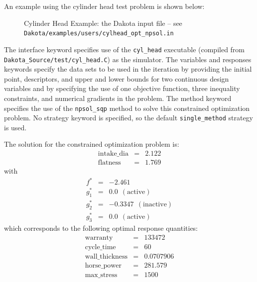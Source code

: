An example using the cylinder head test problem is shown below:
\begin{figure}[ht!]
  \centering
  \begin{small}
    \begin{bigbox}
    \end{bigbox}
  \end{small}
  \caption{Cylinder Head Example: the Dakota input file --
see \texttt{Dakota/examples/users/cylhead\_opt\_npsol.in} }
  \label{additional:cylinder_head}
\end{figure}

The interface keyword specifies use of the \texttt{cyl\_head}
executable (compiled from \texttt{Dakota\_Source/test/cyl\_head.C}) as the
simulator. The variables and responses keywords specify the data sets
to be used in the iteration by providing the initial point,
descriptors, and upper and lower bounds for two continuous design
variables and by specifying the use of one objective function, three
inequality constraints, and numerical gradients in the problem. The
method keyword specifies the use of the \texttt{npsol\_sqp} method to
solve this constrained optimization problem. No strategy keyword is
specified, so the default \texttt{single\_method} strategy is used.

The solution for the constrained optimization problem is:
\begin{eqnarray*}
    \mathrm{intake\_dia} &=& 2.122 \\
    \mathrm{flatness}    &=& 1.769
\end{eqnarray*}
with
\begin{eqnarray*}
      f^{\ast} &=& -2.461 \\
    g_1^{\ast} &=&  0.0    ~~\mathrm{(active)} \\
    g_2^{\ast} &=& -0.3347 ~~\mathrm{(inactive)} \\
    g_3^{\ast} &=&  0.0    ~~\mathrm{(active)}
\end{eqnarray*}
which corresponds to the following optimal response quantities:
\begin{eqnarray*}
    \mathrm{warranty}        &=& 133472 \\
    \mathrm{cycle\_time}     &=& 60 \\
    \mathrm{wall\_thickness} &=& 0.0707906 \\
    \mathrm{horse\_power}    &=& 281.579 \\
    \mathrm{max\_stress}     &=& 1500
\end{eqnarray*}

